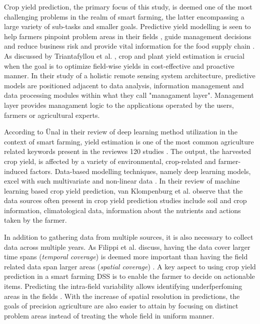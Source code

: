 Crop yield prediction, the primary focus of this study, is deemed one of the most challenging problems in the realm of smart farming, the latter encompassing a large variety of sub-tasks and smaller goals. Predictive yield modelling is seen to help farmers pinpoint problem areas in their fields \cite{Shidnal2019}, guide management decisions and reduce business risk \cite{Filippi2019} and provide vital information for the food supply chain \cite{Zhao2020}. As discussed by Triantafyllou et al. \cite{Triantafyllou2019}, crop and plant yield estimation is crucial when the goal is to optimize field-wise yields in cost-effective and proactive manner. In their study of a holistic remote sensing system architecture, predictive models are positioned adjacent to data analysis, information management and data processing modules within what they call "managament layer". Management layer provides managament logic to the applications operated by the users, farmers or agricultural experts. 

According to {\"{U}}nal in their review of deep learning method utilization in the context of smart farming, yield estimation is one of the most common agriculture related keywords present in the reviewes 120 studies \cite{Unal2020}. The output, the harvested crop yield, is affected by a variety of environmental, crop-related and farmer-induced factors. Data-based modelling techniques, namely deep learning models, excel with such multivariate and non-linear data \cite{Xu2019}. In their review of machine learning based crop yield prediction, van Klompenburg et al. \cite{VanKlompenburg2020} observe that the data sources often present in crop yield prediction studies include soil and crop information, climatological data, information about the nutrients and actions taken by the farmer. 

In addition to gathering data from multiple sources, it is also necessary to collect data across multiple years. As Filippi et al. discuss, having the data cover larger time spans (\emph{temporal coverage}) is deemed more important than having the field related data span larger areas (\emph{spatial coverage}) \cite{Filippi2019}. A key aspect to using crop yield prediction in a smart farming DSS is to enable the farmer to decide on actionable items. Predicting the intra-field variability allows identifying underfperfoming areas in the fields \cite{Tantalaki2019}. With the increase of spatial resolution in predictions, the goals of precision agriculture are also easier to attain by focusing on distinct problem areas instead of treating the whole field in uniform manner.


